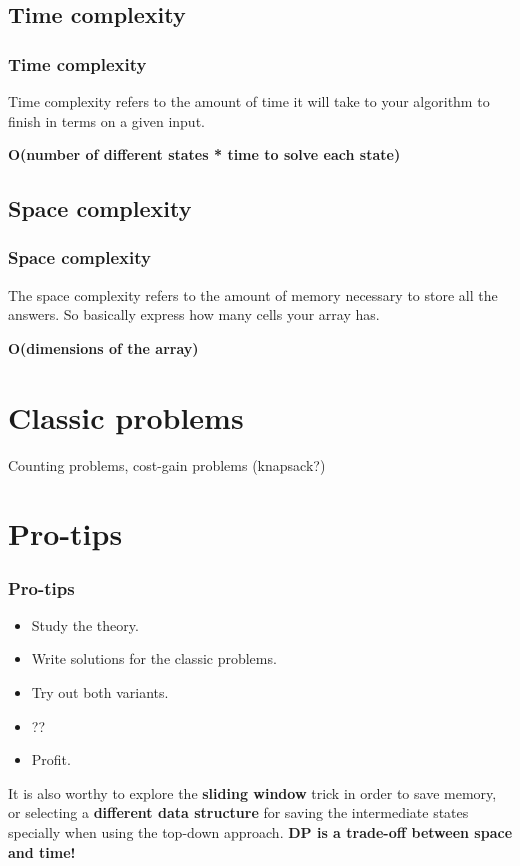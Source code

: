 \documentclass[article]{beamer}
\begin{document}
\subsection{Time complexity}
\begin{frame}
	\frametitle{Time complexity}
	Time complexity refers to the amount of time it will take to your algorithm to finish in terms on a given input. 
	
	\vspace{8mm}	
	
	\textbf{O(number of different states * time to solve each state)}
\end{frame}

\subsection{Space complexity}
\begin{frame}
	\frametitle{Space complexity}
	The space complexity refers to the amount of memory necessary to store all the answers. So basically express how many cells your array has.
	
	\vspace{8mm}
	
	\textbf{O(dimensions of the array)}
\end{frame}

\section{Classic problems}
\begin{frame}
	Counting problems, cost-gain problems (knapsack?)
\end{frame}

\section{Pro-tips}
\begin{frame}
	\frametitle{Pro-tips}
	\begin{itemize}
		\item Study the theory.
		\item Write solutions for the classic problems.
		\item Try out both variants.
		\item ??
		\item Profit.
	\end{itemize}
	
	\vspace{5mm}
	
	It is also worthy to explore the \textbf{sliding window} trick in order to save memory, or selecting a \textbf{different data structure} for saving the intermediate states specially when using the top-down approach. \textbf{DP is a trade-off between space and time!}
\end{frame}
\end{document}

